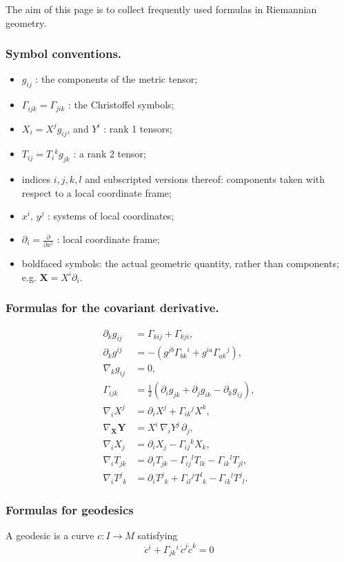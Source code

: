 \documentclass[12pt]{article}
\newcommand{\bX}{\boldsymbol{X}}
\newcommand{\bY}{\boldsymbol{Y}}
\begin{document}
The aim of this page is to  collect
frequently used formulas in Riemannian geometry.

\subsubsection*{Symbol conventions.}
\begin{itemize}
\item $g_{ij}$ : the components of the
  metric tensor;
\item  $\Gamma_{ijk}=\Gamma_{jik}$ : the Christoffel symbols; 
\item $X_i=X^j g_{ij}$, and $Y^i$  : rank 1
  tensors;
\item $T_{ij}=T_{i}{}^{k} g_{jk}$ : a rank 2 tensor;
\item indices $i,j,k,l$ and subscripted versions thereof:  components
taken with respect to a local coordinate frame;
\item $x^i$, $y^j$ : systems of local coordinates;
\item $\partial_i = \frac{\partial}{\partial x^i}$ : local coordinate frame;
\item boldfaced symbols: the actual geometric quantity, rather
  than components; e.g.  $\bX = X^i \partial_i.$
\end{itemize}



\subsubsection*{Formulas for the covariant derivative.}
\begin{align*}
  \partial_k g_{ij} &= \Gamma_{kij} + \Gamma_{kji},\\
  \partial_k g^{ij} &= -(g^{jb} \Gamma_{bk}{}^i + g^{ia} \Gamma_{ak}{}^j), \\
  \nabla_k g_{ij} &= 0,\\
  \Gamma_{ijk} &= \tfrac{1}{2} ( \partial_i g_{jk} + \partial_j
  g_{ik}-\partial_k g_{ij}),\\
  \nabla_i X^j &= \partial_i X^j + \Gamma_{ik}{}^j X^k,\\
  \nabla_{\bX} \bY &= X^i \,\nabla_i Y^j\, \partial_j,\\
  \nabla_i X_j &= \partial_i X_j - \Gamma_{ij}{}^k X_k,\\
  \nabla_i T_{jk} &= \partial_i T_{jk} - \Gamma_{ij}{}^l T_{lk}
  -  \Gamma_{ik}{}^l T_{jl},\\
  \nabla_i T^j{}_k &= \partial_i T^j{}_k + \Gamma_{il}{}^j T^l{}_k -
  \Gamma_{ik}{}^l T^j{}_l.
\end{align*}

\subsubsection*{Formulas for geodesics}
A geodesic is a curve $c\colon I \to M$ satisfying
\[
\ddot{c}{}^i + \Gamma_{jk}{}^i\, \dot{c}^j\dot{c}^k = 0
\]
\end{document}
